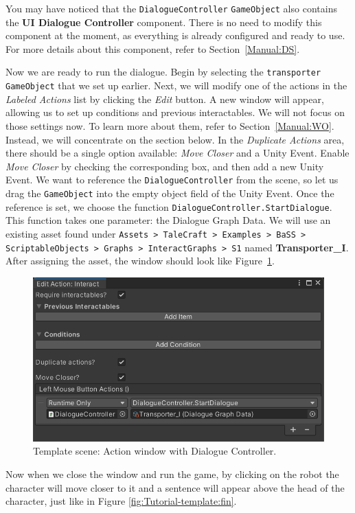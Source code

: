 You may have noticed that the \texttt{DialogueController} \texttt{GameObject} also contains the \textbf{UI Dialogue Controller} component. There is no need to modify this component at the moment, as everything is already configured and ready to use. For more details about this component, refer to Section~\ref{Manual:DS}.

Now we are ready to run the dialogue. Begin by selecting the \texttt{transporter} \texttt{GameObject} that we set up earlier. Next, we will modify one of the actions in the \textit{Labeled Actions} list by clicking the \textit{Edit} button. A new window will appear, allowing us to set up conditions and previous interactables. We will not focus on those settings now. To learn more about them, refer to Section~\ref{Manual:WO}. Instead, we will concentrate on the section below. In the \textit{Duplicate Actions} area, there should be a single option available: \textit{Move Closer} and a Unity Event. Enable \textit{Move Closer} by checking the corresponding box, and then add a new Unity Event. We want to reference the \texttt{DialogueController} from the scene, so let us drag the \texttt{GameObject} into the empty object field of the Unity Event. Once the reference is set, we choose the function \texttt{DialogueController.StartDialogue}. This function takes one parameter: the Dialogue Graph Data. We will use an existing asset found under \texttt{Assets > TaleCraft > Examples > BaSS > ScriptableObjects > Graphs > InteractGraphs > S1} named \textbf{Transporter\_I}. After assigning the asset, the window should look like Figure~\ref{fig:Tutorial-template:AW+DC}.

\begin{figure}[H]
\centering
\includegraphics[width=0.75\linewidth]{img/User doc/image_2025-07-09_112421422.png}
\caption{Template scene: Action window with Dialogue Controller.}
\label{fig:Tutorial-template:AW+DC}
\end{figure}

Now when we close the window and run the game, by clicking on the robot the character will move closer to it and a sentence will appear above the head of the character, just like in Figure \ref{fig:Tutorial-template:fin}.

